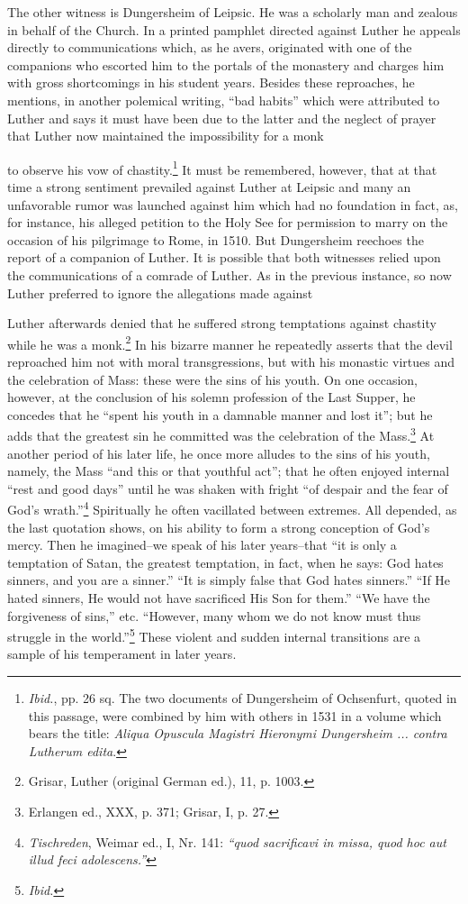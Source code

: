 The other witness is Dungersheim of Leipsic. He was a scholarly
man and zealous in behalf of the Church. In a printed pamphlet
directed against Luther he appeals directly to communications which,
as he avers, originated with one of the companions who escorted
him to the portals of the monastery and charges him with gross shortcomings
in his student years. Besides these reproaches, he mentions,
in another polemical writing, “bad habits” which were attributed
to Luther and says it must have been due to the latter and the neglect
of prayer that Luther now maintained the impossibility for a monk

to observe his vow of chastity.\footnote{\textit{Ibid.}, pp. 26 sq. The two documents of Dungersheim of Ochsenfurt, quoted in this passage, were combined by him with others in 1531 in a volume which bears the title: \textit{Aliqua Opuscula Magistri Hieronymi Dungersheim ... contra Lutherum edita}.}
It must be remembered, however,
that at that time a strong sentiment prevailed against Luther at
Leipsic and many an unfavorable rumor was launched against him
which had no foundation in fact, as, for instance, his alleged petition
to the Holy See for permission to marry on the occasion of his
pilgrimage to Rome, in 1510. But Dungersheim reechoes the report of
a companion of Luther. It is possible that both witnesses relied upon
the communications of a comrade of Luther. As in the previous instance,
so now Luther preferred to ignore the allegations made against

Luther afterwards denied that he suffered strong temptations
against chastity while he was a monk.\footnote{Grisar, Luther (original German ed.), 11, p. 1003.}
In his bizarre manner he
repeatedly asserts that the devil reproached him not with moral
transgressions, but with his monastic virtues and the celebration of
Mass: these were the sins of his youth. On one occasion, however,
at the conclusion of his solemn profession of the Last Supper, he
concedes that he “spent his youth in a damnable manner and lost
it”; but he adds that the greatest sin he committed was the celebration
of the Mass.\footnote{Erlangen ed., XXX, p. 371; Grisar, I, p. 27.}
At another period of his later life, he once
more alludes to the sins of his youth, namely, the Mass “and this
or that youthful act”; that he often enjoyed internal “rest and good
days” until he was shaken with fright “of despair and the fear of
God’s wrath.”\footnote{\textit{Tischreden}, Weimar ed., I, Nr. 141: \textit{``quod sacrificavi in missa, quod hoc aut illud feci adolescens.''}}
Spiritually he often vacillated between extremes.
All depended, as the last quotation shows, on his ability to form
a strong conception of God’s mercy. Then he imagined--we speak of
his later years--that “it is only a temptation of Satan, the greatest
temptation, in fact, when he says: God hates sinners, and you are
a sinner.” “It is simply false that God hates sinners.” “If He hated
sinners, He would not have sacrificed His Son for them.” “We have
the forgiveness of sins,” etc. “However, many whom we do not
know must thus struggle in the world.”\footnote{\textit{Ibid.}}
These violent and sudden internal transitions are a sample of his temperament in later years.


